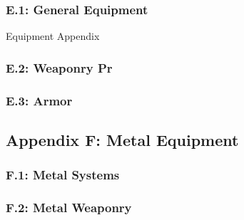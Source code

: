 \documentclass[
]{article}
\begin{document}
\hypertarget{e.1-general-equipment}{%
\subsubsection{E.1: General Equipment}\label{e.1-general-equipment}}

{Equipment Appendix}

\hypertarget{e.2-weaponry-pr}{%
\subsubsection{E.2: Weaponry Pr}\label{e.2-weaponry-pr}}

\hypertarget{e.3-armor}{%
\subsubsection{E.3: Armor}\label{e.3-armor}}

\hypertarget{appendix-f-metal-equipment}{%
\subsection{Appendix F: Metal
Equipment}\label{appendix-f-metal-equipment}}

\hypertarget{f.1-metal-systems}{%
\subsubsection{F.1: Metal Systems}\label{f.1-metal-systems}}

\hypertarget{f.2-metal-weaponry}{%
\subsubsection{F.2: Metal Weaponry}\label{f.2-metal-weaponry}}
\end{document}
